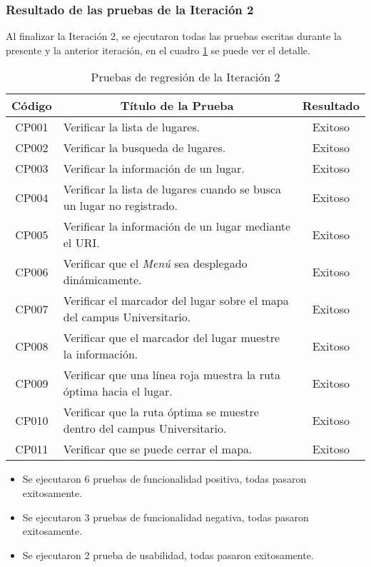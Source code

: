 \subsubsection{Resultado de las pruebas de la Iteración 2}

Al finalizar la Iteración 2, se ejecutaron todas las pruebas escritas durante la presente y la anterior iteración, en el cuadro \ref{tab:regresion_2} se puede ver el detalle.


\begin{table}[H]
  \begin{center}
    \begin{tabularx}{0.8\textwidth}{ c  X  c }
      \toprule
        \textbf{Código} &
        \multicolumn{1}{c}{\textbf{Título de la Prueba}} &
        \textbf{Resultado}\\

\midrule
CP001
&
Verificar la lista de lugares.
&
Exitoso \\

CP002
&
Verificar la busqueda de lugares.
&
Exitoso \\

CP003
&
Verificar la información de un lugar.
&
Exitoso \\

CP004
&
Verificar la lista de lugares cuando se busca un lugar no registrado.
&
Exitoso \\

CP005
&
Verificar la información de un lugar mediante el URI.
&
Exitoso \\

CP006
&
Verificar que el \emph{Menú} sea desplegado dinámicamente.
&
Exitoso \\

CP007
&
Verificar el marcador del lugar sobre el mapa del campus Universitario.
&
Exitoso \\

CP008
&
Verificar que el marcador del lugar muestre la información.
&
Exitoso \\


CP009
&
Verificar que una línea roja muestra la ruta óptima hacia el lugar.
&
Exitoso \\

CP010
&
Verificar que la ruta óptima se muestre dentro del campus Universitario.
&
Exitoso \\


CP011
&
Verificar que se puede cerrar el mapa.
&
Exitoso \\


      \bottomrule
    \end{tabularx}
    \caption{Pruebas de regresión de la Iteración 2}
    \label{tab:regresion_2}
  \end{center}
\end{table}


\begin{itemize}
  \item Se ejecutaron 6 pruebas de funcionalidad positiva, todas pasaron exitosamente.
  \item Se ejecutaron 3 pruebas de funcionalidad negativa, todas pasaron exitosamente.
  \item Se ejecutaron 2 prueba de usabilidad, todas pasaron exitosamente.
\end{itemize}
